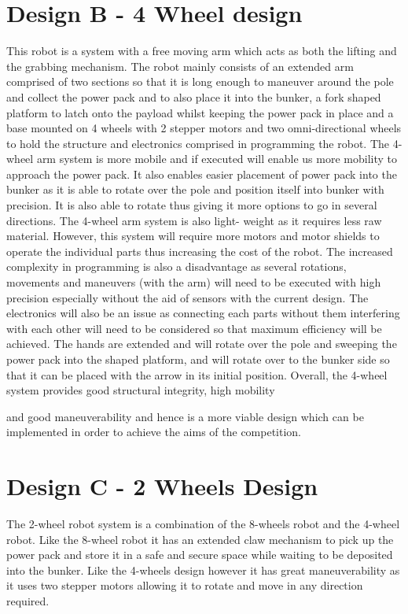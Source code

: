\documentclass[12pt]{report}
\begin{document}

\section{Design B - 4 Wheel design}
This robot is a system with a free moving arm which acts as both the lifting and the grabbing
mechanism. The robot mainly consists of an extended arm comprised of two sections so that it is
long enough to maneuver around the pole and collect the power pack and to also place it into the
bunker, a fork shaped platform to latch onto the payload whilst keeping the power pack in place
and a base mounted on 4 wheels with 2 stepper motors and two omni-directional wheels to hold
the structure and electronics comprised in programming the robot.
The 4-wheel arm system is more mobile and if executed will enable us more mobility to
approach the power pack. It also enables easier placement of power pack into the bunker as it is
able to rotate over the pole and position itself into bunker with precision. It is also able to rotate
thus giving it more options to go in several directions. The 4-wheel arm system is also light-
weight as it requires less raw material. However, this system will require more motors and motor
shields to operate the individual parts thus increasing the cost of the robot. The increased
complexity in programming is also a disadvantage as several rotations, movements and
maneuvers (with the arm) will need to be executed with high precision especially without the aid
of sensors with the current design. The electronics will also be an issue as connecting each parts
without them interfering with each other will need to be considered so that maximum efficiency
will be achieved.
The hands are extended and will rotate over the pole and sweeping the power pack into the
shaped platform, and will rotate over to the bunker side so that it can be placed with the arrow in
its initial position. Overall, the 4-wheel system provides good structural integrity, high mobility

and good maneuverability and hence is a more viable design which can be implemented in order
to achieve the aims of the competition.

\section{Design C - 2 Wheels Design}
The 2-wheel robot system is a combination of the 8-wheels robot and the 4-wheel robot. Like the 8-wheel robot it has an extended claw mechanism to pick up the power pack and store it in a safe and secure space while waiting to be deposited into the bunker. Like the 4-wheels design however it has great maneuverability as it uses two stepper motors allowing it to rotate and move in any direction required.
\end{document}
